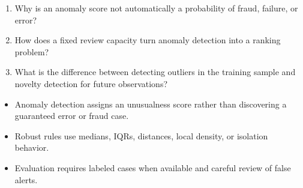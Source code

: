 \begin{quickcheck}
\begin{enumerate}
  \item Why is an anomaly score not automatically a probability of fraud, failure, or error?
  \item How does a fixed review capacity turn anomaly detection into a ranking problem?
  \item What is the difference between detecting outliers in the training sample and novelty detection for future observations?
\end{enumerate}
\end{quickcheck}

\begin{chapterrecap}
\begin{itemize}
  \item Anomaly detection assigns an unusualness score rather than discovering a guaranteed error or fraud case.
  \item Robust rules use medians, IQRs, distances, local density, or isolation behavior.
  \item Evaluation requires labeled cases when available and careful review of false alerts.
\end{itemize}
\end{chapterrecap}
